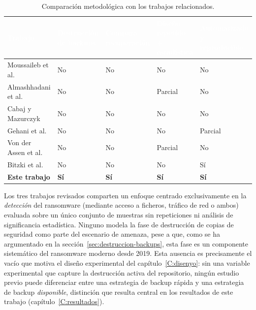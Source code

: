 \documentclass[../main.tex]{subfiles}
\begin{document}
\begin{table}[!h]
  \centering
  \begin{tabularx}{\textwidth}{X C{2.6cm} C{2.6cm} C{2.6cm} C{2.6cm}}
    \toprule
    \textcolor{white}{\textbf{Trabajo}} &
    \textcolor{white}{\textbf{Destrucción de backups}} &
    \textcolor{white}{\textbf{Compara recuperación}} &
    \textcolor{white}{\textbf{Diseño repetido + estadística}} &
    \textcolor{white}{\textbf{Automatizado y reproducible}} \\
    \midrule
    Moussaileb et al.~\cite{moussaileb2021}      & No & No & No & No \\
    Almashhadani et al.~\cite{almashhadani2019} & No & No & Parcial & No \\
    Cabaj y Mazurczyk~\cite{cabaj2016}            & No & No & No & No \\
    Gehani et al.~\cite{gehani2023}                & No & No & No & Parcial \\
    Von der Assen et al.~\cite{vonderassen2024}    & No & No & Parcial & No \\
    Bitzki et al.~\cite{netsecbed2026}              & No & No & No & Sí \\
    \textbf{Este trabajo}                         & \textbf{Sí} & \textbf{Sí} & \textbf{Sí} & \textbf{Sí} \\
    \bottomrule
  \end{tabularx}
  \caption[Comparación metodológica con los trabajos relacionados.]
          {Comparación metodológica con los trabajos relacionados.}
  \label{tab:gap-analysis}
\end{table}

Los tres trabajos revisados comparten un enfoque centrado exclusivamente
en la \emph{detección} del ransomware (mediante acceso a ficheros,
tráfico de red o ambos) evaluada sobre un único conjunto de muestras
sin repeticiones ni análisis de significancia estadística. Ninguno modela
la fase de destrucción de copias de seguridad como parte del escenario de
amenaza, pese a que, como se ha argumentado en la
sección~\ref{sec:destruccion-backups}, esta fase es un
componente sistemático del ransomware moderno desde 2019. Esta ausencia es
precisamente el vacío que motiva el diseño experimental del
capítulo~\ref{C:disenyo}: sin una variable experimental que capture la
destrucción activa del repositorio, ningún estudio previo puede
diferenciar entre una estrategia de backup rápida y una estrategia de
backup \emph{disponible}, distinción que resulta central en los
resultados de este trabajo (capítulo~\ref{C:resultados}).
\end{document}
